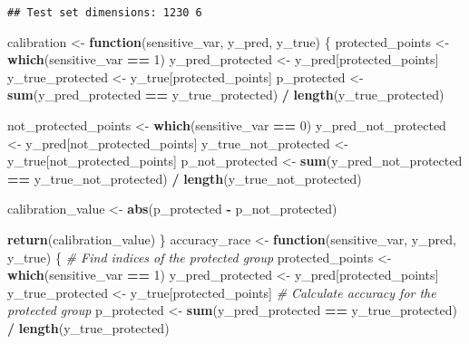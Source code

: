 \documentclass[
]{article}
\newenvironment{Shaded}{\begin{snugshade}}{\end{snugshade}}
\newcommand{\CommentTok}[1]{\textcolor[rgb]{0.56,0.35,0.01}{\textit{#1}}}
\newcommand{\ControlFlowTok}[1]{\textcolor[rgb]{0.13,0.29,0.53}{\textbf{#1}}}
\newcommand{\DecValTok}[1]{\textcolor[rgb]{0.00,0.00,0.81}{#1}}
\newcommand{\FunctionTok}[1]{\textcolor[rgb]{0.13,0.29,0.53}{\textbf{#1}}}
\newcommand{\NormalTok}[1]{#1}
\newcommand{\OtherTok}[1]{\textcolor[rgb]{0.56,0.35,0.01}{#1}}
\newcommand{\SpecialCharTok}[1]{\textcolor[rgb]{0.81,0.36,0.00}{\textbf{#1}}}
\begin{document}
\begin{verbatim}
## Test set dimensions: 1230 6
\end{verbatim}

\begin{Shaded}
\begin{Highlighting}[]
\NormalTok{calibration }\OtherTok{\textless{}{-}} \ControlFlowTok{function}\NormalTok{(sensitive\_var, y\_pred, y\_true) \{}
\NormalTok{  protected\_points }\OtherTok{\textless{}{-}} \FunctionTok{which}\NormalTok{(sensitive\_var }\SpecialCharTok{==} \DecValTok{1}\NormalTok{)}
\NormalTok{  y\_pred\_protected }\OtherTok{\textless{}{-}}\NormalTok{ y\_pred[protected\_points]}
\NormalTok{  y\_true\_protected }\OtherTok{\textless{}{-}}\NormalTok{ y\_true[protected\_points]}
\NormalTok{  p\_protected }\OtherTok{\textless{}{-}} \FunctionTok{sum}\NormalTok{(y\_pred\_protected }\SpecialCharTok{==}\NormalTok{ y\_true\_protected) }\SpecialCharTok{/} \FunctionTok{length}\NormalTok{(y\_true\_protected)}
  
\NormalTok{  not\_protected\_points }\OtherTok{\textless{}{-}} \FunctionTok{which}\NormalTok{(sensitive\_var }\SpecialCharTok{==} \DecValTok{0}\NormalTok{)}
\NormalTok{  y\_pred\_not\_protected }\OtherTok{\textless{}{-}}\NormalTok{ y\_pred[not\_protected\_points]}
\NormalTok{  y\_true\_not\_protected }\OtherTok{\textless{}{-}}\NormalTok{ y\_true[not\_protected\_points]}
\NormalTok{  p\_not\_protected }\OtherTok{\textless{}{-}} \FunctionTok{sum}\NormalTok{(y\_pred\_not\_protected }\SpecialCharTok{==}\NormalTok{ y\_true\_not\_protected) }\SpecialCharTok{/} \FunctionTok{length}\NormalTok{(y\_true\_not\_protected)}
  
\NormalTok{  calibration\_value }\OtherTok{\textless{}{-}} \FunctionTok{abs}\NormalTok{(p\_protected }\SpecialCharTok{{-}}\NormalTok{ p\_not\_protected)}
  
  \FunctionTok{return}\NormalTok{(calibration\_value)}
\NormalTok{\}}
\NormalTok{accuracy\_race }\OtherTok{\textless{}{-}} \ControlFlowTok{function}\NormalTok{(sensitive\_var, y\_pred, y\_true) \{}
  \CommentTok{\# Find indices of the protected group}
\NormalTok{  protected\_points }\OtherTok{\textless{}{-}} \FunctionTok{which}\NormalTok{(sensitive\_var }\SpecialCharTok{==} \DecValTok{1}\NormalTok{)}
\NormalTok{  y\_pred\_protected }\OtherTok{\textless{}{-}}\NormalTok{ y\_pred[protected\_points]}
\NormalTok{  y\_true\_protected }\OtherTok{\textless{}{-}}\NormalTok{ y\_true[protected\_points]}
  \CommentTok{\# Calculate accuracy for the protected group}
\NormalTok{  p\_protected }\OtherTok{\textless{}{-}} \FunctionTok{sum}\NormalTok{(y\_pred\_protected }\SpecialCharTok{==}\NormalTok{ y\_true\_protected) }\SpecialCharTok{/} \FunctionTok{length}\NormalTok{(y\_true\_protected)}
  

\end{Highlighting}
\end{Shaded}
\end{document}
